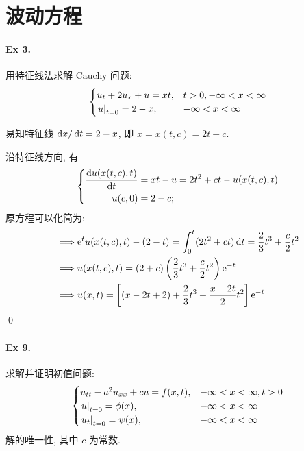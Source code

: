 \section{波动方程}
\paragraph{Ex 3.}
用特征线法求解 Cauchy 问题:
\[ \begin{cases}
u_t + 2u_x + u = xt, & t > 0, -\infty < x < \infty \\
{\left.{u} \right|}_{t=0} = 2 - x, & -\infty < x < \infty
\end{cases} \]

\begin{solution}
易知特征线 $\operatorname{d\!} x /\operatorname{d\!} t = 2 - x$, 即 $x = x(t, c) = 2t + c$.

沿特征线方向, 有
\[ {\left\{ \begin{aligned} 
    \frac{\operatorname{d\!} u(x(t, c), t)}{\operatorname{d\!} t} &= xt - u = 2t^2 + ct - u(x(t, c), t) \\
    u(c, 0) &= 2 - c;
 \end{aligned} \right.} \]
原方程可以化简为:
\[ \begin{aligned}
\implies & {\mathrm e}^t u(x(t, c), t) - (2 - t) = \int_0^t (2t^2+ct)\operatorname{d\!} t =
  \frac23 t^3 + \frac{c}{2} t^2 \\
\implies & u(x(t,c),t) = (2+c)\left(\frac23 t^3+\frac{c}{2}t^2\right){\mathrm e}^{-t} \\
\implies & u(x,t) = \left[(x - 2t+ 2) + \frac23 t^3 + \frac{x-2t}{2}t^2 \right]
  {\mathrm e}^{-t} \\
\end{aligned} \]
\qed
\end{solution}


\paragraph{Ex 9.}
求解并证明初值问题:
\[ \begin{cases}
u_{tt} - a^2 u_{xx} + cu = f(x, t), & -\infty < x < \infty, t > 0 \\
{\left.{u} \right|}_{t=0} = \phi(x), & -\infty < x < \infty \\
{\left.{u_t} \right|}_{t=0} = \psi(x), & -\infty < x < \infty
\end{cases} \]
解的唯一性, 其中 $c$ 为常数.

